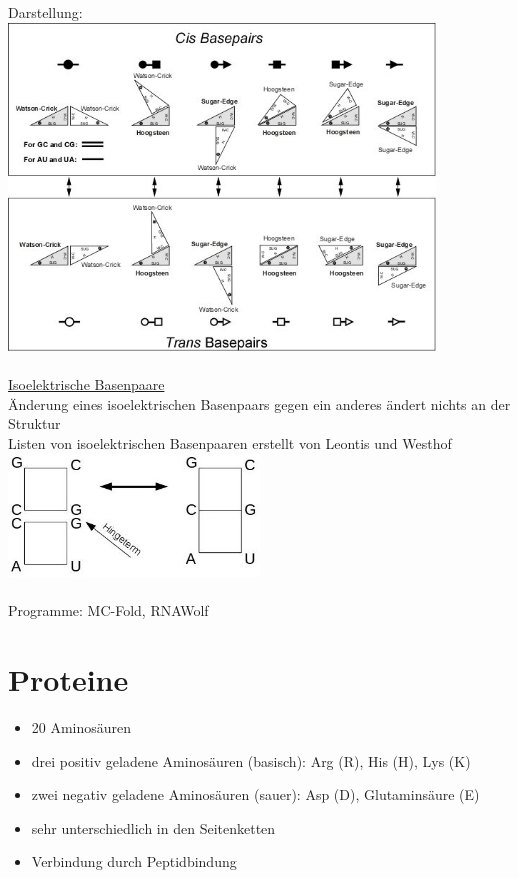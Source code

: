 Darstellung:\\
\includegraphics[width=0.85\textwidth]{lectures/160530/pix/geometric-family.jpg}
\\\\
\underline{Isoelektrische Basenpaare}\\
Änderung eines isoelektrischen Basenpaars gegen ein anderes ändert nichts an der Struktur\\
Listen von isoelektrischen Basenpaaren erstellt von Leontis und Westhof\\

\includegraphics[width=0.5\textwidth]{lectures/160530/pix/hingeterm.jpg}
\\\\
Programme: MC-Fold, RNAWolf\\

\section{Proteine}

\begin{itemize}
	\item 20 Aminosäuren
	\item drei positiv geladene Aminosäuren (basisch): Arg (R), His (H), Lys (K)
	\item zwei negativ geladene Aminosäuren (sauer): Asp (D), Glutaminsäure (E)
	\item sehr unterschiedlich in den Seitenketten
	\item Verbindung durch Peptidbindung
\end{itemize}


